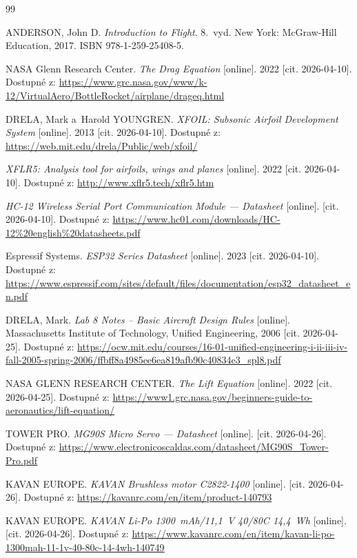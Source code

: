 \documentclass[12pt, a4paper, oneside]{report}
\begin{document}
\begin{thebibliography}{99}

 ANDERSON, John D. \emph{Introduction to Flight}.
8.~vyd. New York: McGraw-Hill Education, 2017. ISBN 978-1-259-25408-5.

 NASA Glenn Research Center. \emph{The Drag Equation}
[online]. 2022 [cit. 2026-04-10].
Dostupné z: \url{https://www.grc.nasa.gov/www/k-12/VirtualAero/BottleRocket/airplane/drageq.html}

 DRELA, Mark a~Harold YOUNGREN. \emph{XFOIL: Subsonic
Airfoil Development System} [online]. 2013 [cit. 2026-04-10].
Dostupné z: \url{https://web.mit.edu/drela/Public/web/xfoil/}

 \emph{XFLR5: Analysis tool for airfoils, wings and planes}
[online]. 2022 [cit. 2026-04-10].
Dostupné z: \url{http://www.xflr5.tech/xflr5.htm}

 \emph{HC-12 Wireless Serial Port Communication Module
--- Datasheet} [online]. [cit. 2026-04-10].
Dostupné z: \url{https://www.hc01.com/downloads/HC-12%20english%20datasheets.pdf}

 Espressif Systems. \emph{ESP32 Series Datasheet}
[online]. 2023 [cit. 2026-04-10].
Dostupné z: \url{https://www.espressif.com/sites/default/files/documentation/esp32_datasheet_en.pdf}


DRELA, Mark. \emph{Lab 8 Notes -- Basic Aircraft Design Rules}
[online]. Massachusetts Institute of Technology, Unified Engineering,
2006 [cit. 2026-04-25]. Dostupné z: \url{https://ocw.mit.edu/courses/16-01-unified-engineering-i-ii-iii-iv-fall-2005-spring-2006/ffbff8a4985ee6ea819afb90c40834e3_spl8.pdf}

NASA GLENN RESEARCH CENTER. \emph{The Lift Equation} [online]. 2022
[cit. 2026-04-25]. Dostupné z: \url{https://www1.grc.nasa.gov/beginners-guide-to-aeronautics/lift-equation/}

TOWER PRO. \emph{MG90S Micro Servo --- Datasheet} [online].
[cit. 2026-04-26]. Dostupné z: \url{https://www.electronicoscaldas.com/datasheet/MG90S_Tower-Pro.pdf}


KAVAN EUROPE. \emph{KAVAN Brushless motor C2822-1400} [online].
[cit. 2026-04-26]. Dostupné z: \url{https://kavanrc.com/en/item/product-140793}


KAVAN EUROPE. \emph{KAVAN Li-Po 1300~mAh/11{,}1~V 40/80C 14{,}4~Wh}
[online]. [cit. 2026-04-26]. Dostupné z: \url{https://www.kavanrc.com/en/item/kavan-li-po-1300mah-11-1v-40-80c-14-4wh-140749}

\end{thebibliography}
\end{document}
